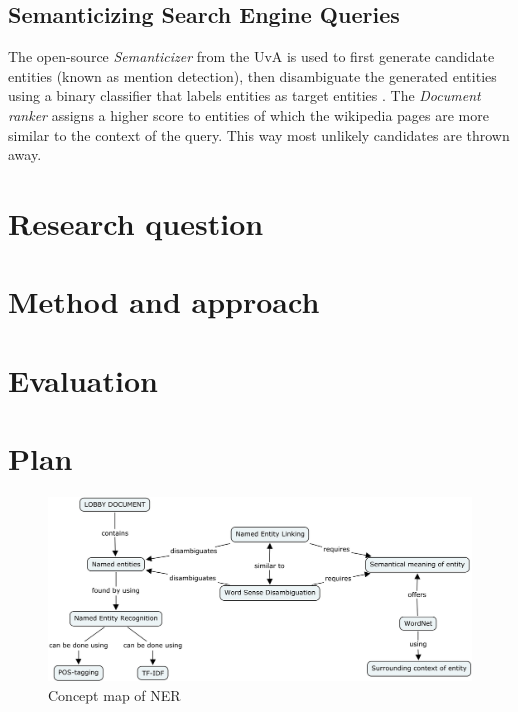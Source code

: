 \documentclass{article}
\begin{document}
\subsection*{Semanticizing Search Engine Queries}
The open-source \textit{Semanticizer} from the UvA is used to first generate candidate entities (known as mention detection), then disambiguate the generated entities using a binary classifier that labels entities as target entities \cite{graus2014semanticizing}. The \textit{Document ranker} assigns a higher score to entities of which the wikipedia pages are more similar to the context of the query. This way most unlikely candidates are thrown away.

\section{Research question}

\section{Method and approach}

\section{Evaluation}

\section{Plan}





\begin{figure}
    \centering
    \includegraphics[scale=0.18]{Figures/ner}
    \caption{Concept map of NER}
    \label{fig:ner}
\end{figure}






\end{document}
